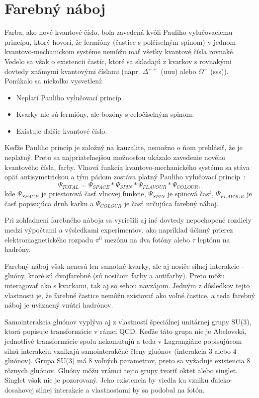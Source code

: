 \documentclass[thesismargins, thesislinespacing]{rnthesis}
\begin{document}
\section{Farebný náboj}
Farba, ako nové kvantové číslo, bola zavedená kvôli Pauliho vylučovaciemu princípu, ktorý hovorí, že fermióny (častice s polčíselným spinom) v jednom kvantovo-me\-cha\-nic\-kom systéme nemôžu mať všetky kvantové čísla rovnaké. Vedelo sa však o existencii častíc, ktoré sa skladajú z kvarkov s rovnakými dovtedy známymi kvantovými číslami (napr. $\Delta^{++}$ (uuu) alebo $\Omega^{-}$ (sss)). Ponúkalo sa niekoľko vysvetlení:
\begin{itemize}
	\item Neplatí Pauliho vylučovací princíp.
	\item Kvarky nie sú fermióny, ale bozóny s celočíselným spinom.
	\item Existuje ďalšie kvantové číslo.
\end{itemize}
Keďže Pauliho princíp je založný na kauzalite, nemožno o ňom prehlásiť, že je neplatný. Preto sa najpriateľnejšou možnosťou ukázalo zavedenie nového kvantového čísla, farby. Vlnová funkcia kvantovo-mechanického systému sa stáva opäť antisymetrickou a tým pádom zostáva platný Pauliho vylučovací princíp~\cite{1}:
\begin{equation}
	\Psi_{TOTAL}=\Psi_{SPACE}*\Psi_{SPIN}*\Psi_{FLAVOUR}*\Psi_{COLOUR}, 
\end{equation}   
kde $\Psi_{SPACE}$ je priestorová časť vlnovej funkcie, $\Psi_{SPIN}$ je spinová časť, $\Psi_{FLAVOUR}$ je časť popisujúca druh karku a $\Psi_{COLOUR}$ je časť určujúca farebný náboj.

Pri zohľadnení farebného náboja sa vyriešili aj iné dovtedy nepochopené rozdiely medzi výpočtami a výsledkami experimentov, ako napríklad účinný prierez elektromagnetického rozpadu $\pi^0$ mezónu na dva fotóny alebo $\tau$ leptónu na hadróny. 

Farebný náboj však nenesú len samotné kvarky, ale aj nosiče silnej interakcie - gluóny, ktoré sú dvojfarebné (sú nosičom farby a antifarby). Preto môžu interagovať ako s kvarkami, tak aj so sebou navzájom. Jedným z dôsledkov tejto vlastnosti je, že farebné častice nemôžu existovať ako voľné častice, a teda farebný náboj je uväznený vnútri hadrónov.

Samointerakcia gluónov vyplýva aj z vlastností špeciálnej unitárnej grupy SU(3), ktorá popisuje transformácie v rámci QCD. Keďže táto grupa nie je Abelovská, jednotlivé transformácie spolu nekomutujú a teda v Lagrangiáne popisujúcom silnú interakciu vznikajú samointerakčné členy gluónov (interakcia 3 alebo 4 gluónov). Grupa SU(3) má 8 voľných parametrov, preto sa vyžaduje existencia 8 rôznych gluónov. Gluóny môžu vrámci tejto grupy tvoriť oktet alebo singlet. Singlet však nie je pozorovaný. Jeho existencia by viedla ku vzniku ďaleko-dosahovej silnej interakcie a vlastnosťami by sa podobal na fotón. 
\end{document}
